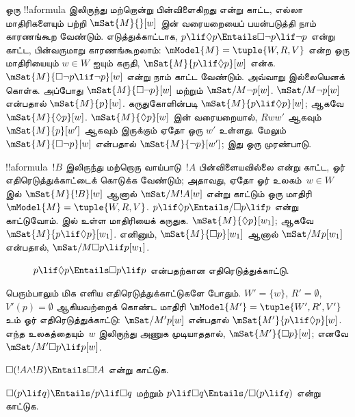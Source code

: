 \documentclass[../../../include/open-logic-section]{subfiles}
\begin{document}
\begin{ex}
  ஒரு !!a{formula} இலிருந்து மற்றொன்று பின்விளைகிறது என்று காட்ட, எல்லா
  மாதிரிகளையும் பற்றி $\mSat{M}{}[w]$ இன் வரையறையைப் பயன்படுத்தி நாம்
  காரணங்கூற வேண்டும். எடுத்துக்காட்டாக, $p \lif \Diamond p \Entails
  \Box\lnot p \lif \lnot p$ என்று காட்ட, பின்வருமாறு காரணங்கூறலாம்:
  $\mModel{M} = \tuple{W, R, V}$ என்ற ஒரு மாதிரியையும் $w \in W$ ஐயும்
  கருதி, $\mSat{M}{p \lif \Diamond p}[w]$ என்க. $\mSat{M}{\Box\lnot p
  \lif \lnot p}[w]$ என்று நாம் காட்ட வேண்டும். அவ்வாறு இல்லையெனக் கொள்க.
  அப்போது $\mSat{M}{\Box\lnot p}[w]$ மற்றும் $\mSat/{M}{\lnot p}[w]$.
  $\mSat/{M}{\lnot p}[w]$ என்பதால் $\mSat{M}{p}[w]$. கருதுகோளின்படி
  $\mSat{M}{p \lif \Diamond p}[w]$; ஆகவே $\mSat{M}{\Diamond p}[w]$.
  $\mSat{M}{\Diamond p}[w]$ இன் வரையறையால், $Rww'$ ஆகவும்
  $\mSat{M}{p}[w']$ ஆகவும் இருக்கும் ஏதோ ஒரு $w'$ உள்ளது. மேலும்
  $\mSat{M}{\Box \lnot p}[w]$ என்பதால் $\mSat{M}{\lnot p}[w']$; இது
  ஒரு முரண்பாடு.

  !!a{formula}~$!B$ இலிருந்து மற்றொரு வாய்பாடு~$!A$ பின்விளையவில்லை என்று
  காட்ட, ஓர் எதிரெடுத்துக்காட்டைக் கொடுக்க வேண்டும்; அதாவது, ஏதோ ஓர்
  உலகம்~$w \in W$ இல் $\mSat{M}{!B}[w]$ ஆனால் $\mSat/{M}{!A}[w]$ என்று
  காட்டும் ஒரு மாதிரி $\mModel{M} = \tuple{W, R, V}$. $p \lif \Diamond
  p \Entails/ \Box p \lif p$ என்று காட்டுவோம்.  இல்
  உள்ள மாதிரியைக் கருதுக. $\mSat{M}{\Diamond p}[w_1]$; ஆகவே
  $\mSat{M}{p \lif \Diamond p}[w_1]$. எனினும்,
  $\mSat{M}{\Box p}[w_1]$ ஆனால் $\mSat/{M}{p}[w_1]$ என்பதால்,
  $\mSat/{M}{\Box p \lif p}[w_1]$.
  \begin{figure}
  \begin{center}
  \end{center}
  \caption{$p \lif \Diamond p
  \Entails \Box p \lif p$ என்பதற்கான எதிரெடுத்துக்காட்டு.}
  \end{figure}

  பெரும்பாலும் மிக எளிய எதிரெடுத்துக்காட்டுகளே போதும்.
  $W' = \{w\}$, $R' = \emptyset$, $V'(p) = \emptyset$ ஆகியவற்றைக் கொண்ட
  மாதிரி $\mModel{M'} = \tuple{W', R', V'}$ உம் ஓர் எதிரெடுத்துக்காட்டு:
  $\mSat/{M'}{p}[w]$ என்பதால் $\mSat{M'}{p \lif \Diamond p}[w]$.
  எந்த உலகத்தையும்~$w$ இலிருந்து அணுக முடியாததால்,
  $\mSat{M'}{\Box p}[w]$; எனவே $\mSat/{M'}{\Box p \lif p}[w]$.
\end{ex}

\begin{prob}
  $\Box (!A \land !B) \Entails \Box !A$ என்று காட்டுக.
\end{prob}

\begin{prob}
  $\Box (p \lif q) \Entails/ p \lif \Box q$ மற்றும் $p \lif \Box
  q \Entails/\Box (p \lif q)$ என்று காட்டுக.
\end{prob}
\end{document}
